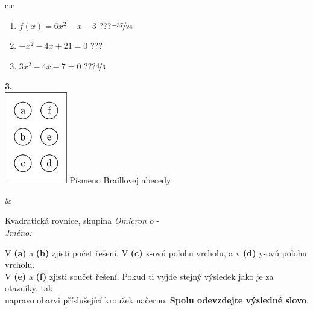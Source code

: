 \documentclass[10pt]{report}
\newcommand\omicron{o}
\begin{document}
\begin{tabular}{c:c}
\begin{minipage}[c][104.5mm][t]{0.5\linewidth}
\begin{center}
\begin{minipage}{0.79\linewidth}
\begin{center}
\begin{varwidth}{\linewidth}
\begin{enumerate}
\item $f(x)=6x^2-x-3$\quad \dotfill\; ???\;\dotfill \quad $\nicefrac{-37}{24}$
\item $-x^2-4x+21=0$\quad \dotfill\; ???\;\dotfill {}
\item $3x^2-4x-7=0$\quad \dotfill\; ???\;\dotfill \quad $\nicefrac{4}{3}$
\end{enumerate}
\end{varwidth}
\end{center}
\end{minipage}
\begin{minipage}{0.20\linewidth}
\begin{center}
{\Huge\bfseries 3.} \\[2mm]
\includegraphics[height=40mm]{../images/braille.png}
{\small Písmeno Braillovej abecedy}
\end{center}
\end{minipage}
\end{center}
\end{minipage}
&
\begin{minipage}[c][104.5mm][t]{0.5\linewidth}
\begin{center}
\vspace{7mm}
{\huge Kvadratická rovnice, skupina \textit{Omicron $\omicron$} -}\\[5mm]
\textit{Jméno:}\phantom{xxxxxxxxxxxxxxxxxxxxxxxxxxxxxxxxxxxxxxxxxxxxxxxxxxxxxxxxxxxxxxxxx}\\[5mm]
\begin{minipage}{0.95\linewidth}
\begin{center}
V \textbf{(a)} a \textbf{(b)} zjisti počet řešení. V \textbf{(c)} x-ovú polohu vrcholu, a v \textbf{(d)} y-ovú polohu vrcholu.\\V \textbf{(e)} a \textbf{(f)} zjisti součet řešení. Pokud ti vyjde stejný výsledek jako je za otazníky, tak\\napravo obarvi příslušející kroužek načerno. \textbf{Spolu odevzdejte výsledné slovo}.
\end{center}
\end{minipage}
\\[1mm]

\end{center}
\end{minipage}
\end{tabular}
\end{document}
